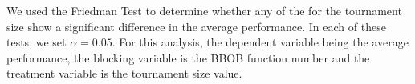 We used the Friedman Test to determine whether any of the for the tournament size show a significant difference in the average performance. In each of these tests, we set $\alpha = 0.05$. For this analysis, the dependent variable being the average performance, the blocking variable is the BBOB function number and the treatment variable is the tournament size value.





